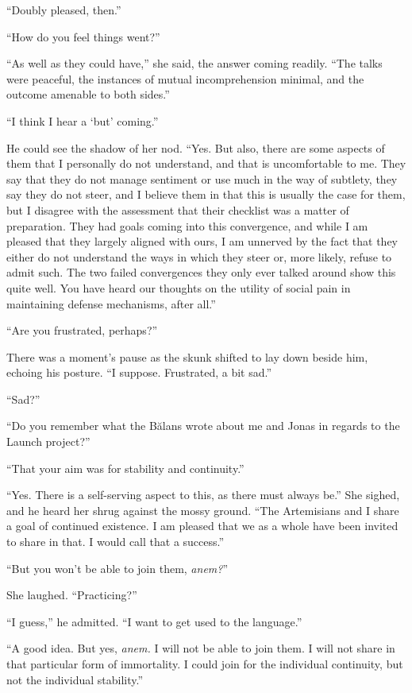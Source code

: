 ``Doubly pleased, then.''

``How do you feel things went?''

``As well as they could have,'' she said, the answer coming readily. ``The talks were peaceful, the instances of mutual incomprehension minimal, and the outcome amenable to both sides.''

``I think I hear a `but' coming.''

He could see the shadow of her nod. ``Yes. But also, there are some aspects of them that I personally do not understand, and that is uncomfortable to me. They say that they do not manage sentiment or use much in the way of subtlety, they say they do not steer, and I believe them in that this is usually the case for them, but I disagree with the assessment that their checklist was a matter of preparation. They had goals coming into this convergence, and while I am pleased that they largely aligned with ours, I am unnerved by the fact that they either do not understand the ways in which they steer or, more likely, refuse to admit such. The two failed convergences they only ever talked around show this quite well. You have heard our thoughts on the utility of social pain in maintaining defense mechanisms, after all.''

``Are you frustrated, perhaps?''

There was a moment's pause as the skunk shifted to lay down beside him, echoing his posture. ``I suppose. Frustrated, a bit sad.''

``Sad?''

``Do you remember what the Bălans wrote about me and Jonas in regards to the Launch project?''

``That your aim was for stability and continuity.''

``Yes. There is a self-serving aspect to this, as there must always be.'' She sighed, and he heard her shrug against the mossy ground. ``The Artemisians and I share a goal of continued existence. I am pleased that we as a whole have been invited to share in that. I would call that a success.''

``But you won't be able to join them, \emph{anem?}''

She laughed. ``Practicing?''

``I guess,'' he admitted. ``I want to get used to the language.''

``A good idea. But yes, \emph{anem.} I will not be able to join them. I will not share in that particular form of immortality. I could join for the individual continuity, but not the individual stability.''


